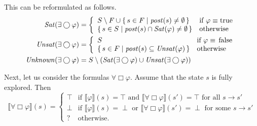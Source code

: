 \documentclass[12pt]{article}
\newcommand{\always}{\Box}
\newcommand{\nxt}{\bigcirc}
\newcommand{\TRUE}{\mbox{\lstinline{true}}}
\newcommand{\FALSE}{\mbox{\lstinline{false}}}
\theoremstyle{definition}
\newcommand{\satisfaction}[1]{\llbracket #1 \rrbracket}
\begin{document}
This can be reformulated as follows.
\begin{align*}
\mathit{Sat}(\exists \nxt \varphi) & = 
\left \{
\begin{array}{ll}
S \setminus F \cup \{\, s \in F \mid \mathit{post}(s) \not= \emptyset \,\} & \mbox{if $\varphi \equiv \TRUE$}\\
\{\, s \in S \mid \mathit{post}(s) \cap \mathit{Sat}(\varphi) \not= \emptyset \,\} & \mbox{otherwise}
\end{array}
\right .\\
\mathit{Unsat}(\exists \nxt \varphi) & = 
\left \{
\begin{array}{ll}
S & \mbox{if $\varphi \equiv \FALSE$}\\
\{\, s \in F \mid \mathit{post}(s) \subseteq \mathit{Unsat}(\varphi) \,\} & \mbox{otherwise}
\end{array}
\right .\\
\mathit{Unknown}(\exists \nxt \varphi) & = S \setminus (\mathit{Sat}(\exists \nxt \varphi) \cup \mathit{Unsat}(\exists \nxt \varphi))
\end{align*}

Next, let us consider the formulas $\forall \always \varphi$.  Assume that the state $s$ is fully explored.  Then 
\[
\satisfaction{\forall \always \varphi}(s) = \left \{
\begin{array}{ll}
\top & \mbox{if $\satisfaction{\varphi}(s) = \top$ and $\satisfaction{\forall \always \varphi}(s') = \top$ for all $s \rightarrow s'$}\\
\perp & \mbox{if $\satisfaction{\varphi}(s) = \perp$ or $\satisfaction{\forall \always \varphi}(s') = \perp$ for some $s \rightarrow s'$}\\
? & \mbox{otherwise.}
\end{array}
\right .
\]
\end{document}

